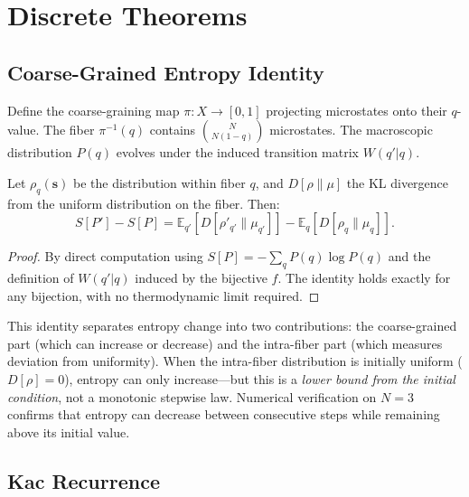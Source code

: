 \documentclass[reprint]{revtex4-2}
\begin{document}
\section{Discrete Theorems}

\subsection{Coarse-Grained Entropy Identity}

Define the coarse-graining map $\pi:X\to[0,1]$ projecting microstates onto their $q$-value. The fiber $\pi^{-1}(q)$ contains $\binom{N}{N(1-q)}$ microstates. The macroscopic distribution $P(q)$ evolves under the induced transition matrix $W(q'|q)$.

\begin{theorem}
\label{thm:entropy}
Let $\rho_q(\mathbf{s})$ be the distribution within fiber $q$, and $D[\rho\|\mu]$ the KL divergence from the uniform distribution on the fiber. Then:
\begin{equation}
S[P'] - S[P] = \mathbb{E}_{q'}[D[\rho'_{q'}\|\mu_{q'}]] - \mathbb{E}_q[D[\rho_q\|\mu_q]].
\end{equation}
\end{theorem}
\begin{proof}
By direct computation using $S[P] = -\sum_q P(q)\log P(q)$ and the definition of $W(q'|q)$ induced by the bijective $f$. The identity holds exactly for any bijection, with no thermodynamic limit required.
\end{proof}

This identity separates entropy change into two contributions: the coarse-grained part (which can increase or decrease) and the intra-fiber part (which measures deviation from uniformity). When the intra-fiber distribution is initially uniform ($D[\rho]=0$), entropy can only increase---but this is a \emph{lower bound from the initial condition}, not a monotonic stepwise law. Numerical verification on $N=3$ confirms that entropy can decrease between consecutive steps while remaining above its initial value.

\subsection{Kac Recurrence}
\end{document}
